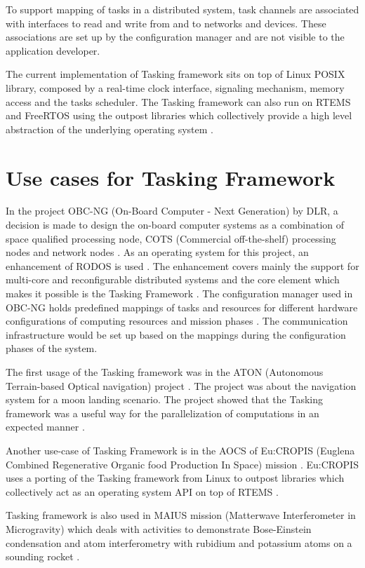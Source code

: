 To support mapping of tasks in a distributed system, task channels are associated with interfaces to read and write from and to networks and devices. These associations are set up by the configuration manager and are not visible to the application developer.

The current implementation of Tasking framework sits on top of Linux POSIX library, composed by a real-time clock interface, signaling mechanism, memory access and the tasks scheduler. The Tasking framework can also run on RTEMS and FreeRTOS using the outpost libraries which collectively provide a high level abstraction of the underlying operating system \cite{TaskFr}.

\section{Use cases for Tasking Framework}
In the project OBC-NG (On-Board Computer - Next Generation) by DLR, a decision is made to design the on-board computer systems as a combination of space qualified processing node, COTS (Commercial off-the-shelf) processing nodes and network nodes \cite{TaskFr}. As an operating system for this project, an enhancement of RODOS is used \cite{TaskFr, OBC-NG}. The enhancement covers mainly the support for multi-core and reconfigurable distributed systems \cite{RODOS} and the core element which makes it possible is the Tasking Framework \cite{TaskFr}. The configuration manager used in OBC-NG holds predefined mappings of tasks and resources for different hardware configurations of computing resources and mission phases \cite{OBC-NG}. The communication infrastructure would be set up based on the mappings during the configuration phases of the system. 

The first usage of the Tasking framework was in the ATON (Autonomous Terrain-based Optical navigation) project \cite{ATON}. The project was about the navigation system for a moon landing scenario. The project showed that the Tasking framework was a useful way for the parallelization of computations in an expected manner \cite{ATON}.

Another use-case of Tasking Framework is in the AOCS of Eu:CROPIS (Euglena Combined Regenerative Organic food Production In Space) mission \cite{TETtoEUCROPIS}. Eu:CROPIS uses a porting of the Tasking framework from Linux to outpost libraries which collectively act as an operating system API on top of RTEMS \cite{TETtoEUCROPIS}.

Tasking framework is also used in MAIUS mission (Matterwave Interferometer in Microgravity) which deals with activities to demonstrate Bose-Einstein condensation and atom interferometry with rubidium and potassium atoms on a sounding rocket \cite{TETtoEUCROPIS,MAIUS}.

